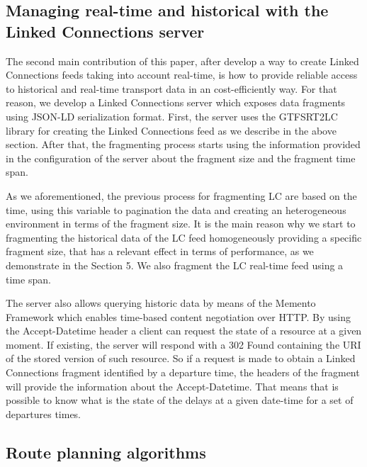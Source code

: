 \documentclass[sw]{iosart2x}
\begin{document}
\subsection{Managing real-time and historical with the Linked Connections server}
The second main contribution of this paper, after develop a way to create Linked Connections feeds taking into account real-time, is how to provide reliable access to historical and real-time transport data in an cost-efficiently way. For that reason, we develop a Linked Connections server which exposes data fragments using JSON-LD serialization format. First, the server uses the GTFSRT2LC library for creating the Linked Connections feed as we describe in the above section. After that, the fragmenting process starts using the information provided in the configuration of the server about the fragment size and the fragment time span. 

As we aforementioned, the previous process for fragmenting LC are based on the time, using this variable to pagination the data and creating an heterogeneous environment in terms of the fragment size. It is the main reason why we start to fragmenting the historical data of the LC feed homogeneously providing a specific fragment size, that has a relevant effect in terms of performance, as we demonstrate in the Section 5. We also fragment the LC real-time feed using a time span. 

The server also allows querying historic data by means of the Memento Framework\cite{van2010http} which enables time-based content negotiation over HTTP. By using the Accept-Datetime header a client can request the state of a resource at a given moment. If existing, the server will respond with a 302 Found containing the URI of the stored version of such resource. So if a request is made to obtain a Linked Connections fragment identified by a departure time, the headers of the fragment will provide the information about the Accept-Datetime. That means that is possible to know what is the state of the delays at a given date-time for a set of departures times.


\subsection{Route planning algorithms}
\end{document}
